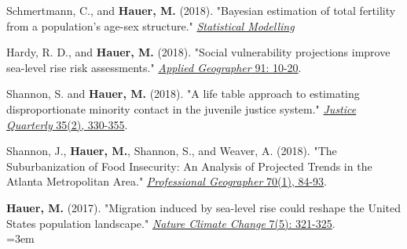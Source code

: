 
 \begin{etaremune}
 
 \item Schmertmann, C., and \textbf{Hauer, M.} (2018). "Bayesian estimation of total fertility from a population's age-sex structure." \href{https://doi.org/10.1177/1471082X18801450 }{\textit{Statistical Modelling}}
 
\item Hardy, R. D., and \textbf{Hauer, M.} (2018). "Social vulnerability projections improve sea-level rise risk assessments." \href{https://www.sciencedirect.com/science/article/pii/S0143622817309189}{\textit{Applied Geographer} 91: 10-20}.
 
\item Shannon, S. and \textbf{Hauer, M.} (2018). "A life table approach to estimating disproportionate minority contact in the juvenile justice system." \href{http://www.tandfonline.com/doi/full/10.1080/07418825.2017.1315163}{\textit{Justice Quarterly} 35(2), 330-355}.

\item Shannon, J., \textbf{Hauer, M.}, Shannon, S., and Weaver, A. (2018). "The Suburbanization of Food Insecurity: An Analysis of Projected     Trends in the Atlanta Metropolitan Area." \href{http://www.tandfonline.com/doi/full/10.1080/00330124.2017.1325751}{\textit{Professional Geographer} 70(1), 84-93}.

\item \textbf{Hauer, M.} (2017). "Migration induced by sea-level rise could reshape the United States population landscape." \href{http://dx.doi.org/10.1038/nclimate3271}{\textit{Nature Climate Change} 7(5): 321-325}.\\
        \hangindent=3em \\
       

\end{etaremune}
